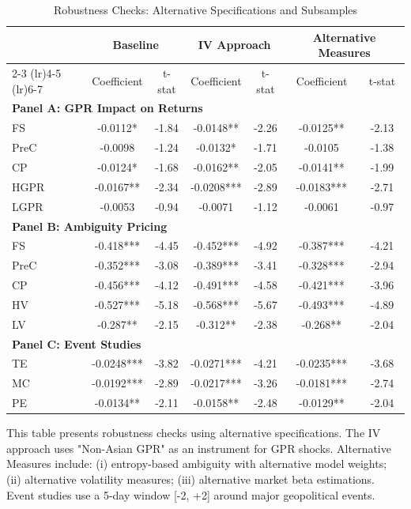 \documentclass[preprint,12pt,authoryear]{elsarticle}
\begin{document}
\begin{table}[htbp]
\centering
\caption{Robustness Checks: Alternative Specifications and Subsamples}
\label{tab:robustness}
\begin{threeparttable}
\begin{tabular*}{\textwidth}{@{\extracolsep{\fill}} lcccccc @{\extracolsep{\fill}}}
\toprule
& \multicolumn{2}{c}{Baseline} & \multicolumn{2}{c}{IV Approach} & \multicolumn{2}{c}{Alternative Measures} \\
\cmidrule(lr){2-3} \cmidrule(lr){4-5} \cmidrule(lr){6-7}
& Coefficient & t-stat & Coefficient & t-stat & Coefficient & t-stat \\
\midrule
\midrule
\multicolumn{7}{l}{\textbf{Panel A: GPR Impact on Returns}} \\
FS & -0.0112* & -1.84 & -0.0148** & -2.26 & -0.0125** & -2.13 \\
PreC & -0.0098 & -1.24 & -0.0132* & -1.71 & -0.0105 & -1.38 \\
CP & -0.0124* & -1.68 & -0.0162** & -2.05 & -0.0141** & -1.99 \\
HGPR & -0.0167** & -2.34 & -0.0208*** & -2.89 & -0.0183*** & -2.71 \\
LGPR & -0.0053 & -0.94 & -0.0071 & -1.12 & -0.0061 & -0.97 \\
\midrule
\multicolumn{7}{l}{\textbf{Panel B: Ambiguity Pricing}} \\
FS & -0.418*** & -4.45 & -0.452*** & -4.92 & -0.387*** & -4.21 \\
PreC & -0.352*** & -3.08 & -0.389*** & -3.41 & -0.328*** & -2.94 \\
CP & -0.456*** & -4.12 & -0.491*** & -4.58 & -0.421*** & -3.96 \\
HV & -0.527*** & -5.18 & -0.568*** & -5.67 & -0.493*** & -4.89 \\
LV & -0.287** & -2.15 & -0.312** & -2.38 & -0.268** & -2.04 \\
\midrule
\multicolumn{7}{l}{\textbf{Panel C: Event Studies}} \\
TE & -0.0248*** & -3.82 & -0.0271*** & -4.21 & -0.0235*** & -3.68 \\
MC & -0.0192*** & -2.89 & -0.0217*** & -3.26 & -0.0181*** & -2.74 \\
PE & -0.0134** & -2.11 & -0.0158** & -2.48 & -0.0129** & -2.04 \\
\bottomrule
\end{tabular*}
\begin{tablenotes}[flushleft]
\small
\item[] This table presents robustness checks using alternative specifications. The IV approach uses "Non-Asian GPR" as an instrument for GPR shocks. Alternative Measures include: (i) entropy-based ambiguity with alternative model weights; (ii) alternative volatility measures; (iii) alternative market beta estimations. Event studies use a 5-day window [-2, +2] around major geopolitical events.

\end{tablenotes}
\end{threeparttable}
\end{table}
\end{document}
